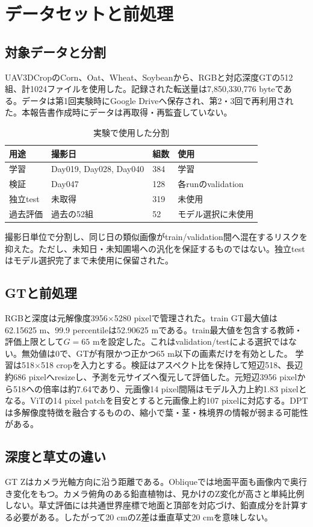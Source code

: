 \chapter{データセットと前処理}
\section{対象データと分割}
UAV3DCropのCorn、Oat、Wheat、Soybeanから、RGBと対応深度GTの512組、計1024ファイルを使用した。記録された転送量は7,850,330,776 byteである。データは第1回実験時にGoogle Driveへ保存され、第2・3回で再利用された。本報告書作成時にデータは再取得・再監査していない。
\begin{table}[H]\centering\caption{実験で使用した分割}\label{tab:split}
\begin{tabular}{llll}\toprule 用途&撮影日&組数&使用\\\midrule
学習&Day019, Day028, Day040&384&学習\\
検証&Day047&128&各runのvalidation\\
独立test&未取得&319&未使用\\
過去評価&過去の52組&52&モデル選択に未使用\\\bottomrule\end{tabular}
\end{table}
撮影日単位で分割し、同じ日の類似画像がtrain/validation間へ混在するリスクを抑えた。ただし、未知日・未知圃場への汎化を保証するものではない。独立testはモデル選択完了まで未使用に保留された。
\section{GTと前処理}
RGBと深度は元解像度3956$\times$5280 pixelで管理された。train GT最大値は62.15625 m、99.9 percentileは52.90625 mである。train最大値を包含する教師・評価上限として$G=65$ mを設定した。これはvalidation/testによる選択ではない。無効値は0で、GTが有限かつ正かつ65 m以下の画素だけを有効とした。
学習は518$\times$518 cropを入力とする。検証はアスペクト比を保持して短辺518、長辺約686 pixelへresizeし、予測を元サイズへ復元して評価した。元短辺3956 pixelから518への倍率は約7.64であり、元画像14 pixel間隔はモデル入力上約1.83 pixelとなる。ViTの14 pixel patchを目安とすると元画像上約107 pixelに対応する。DPTは多解像度特徴を融合するものの、縮小で葉・茎・株境界の情報が弱まる可能性がある。
\section{深度と草丈の違い}
GT Zはカメラ光軸方向に沿う距離である。Obliqueでは地面平面も画像内で奥行き変化をもつ。カメラ俯角のある鉛直植物は、見かけのZ変化が高さと単純比例しない。草丈評価には共通世界座標で地面と頂部を対応づけ、鉛直成分を計算する必要がある。したがって20 cmのZ差は垂直草丈20 cmを意味しない。